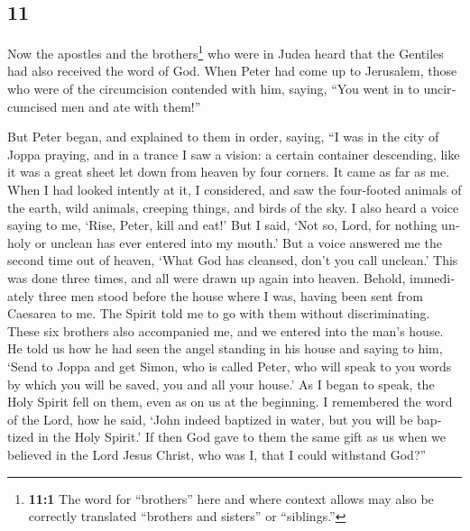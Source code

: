 \begin{paracol}{2}
\switchcolumn
\begin{otherlanguage}{english}

\hypertarget{section-21}{%
\section{11}\label{section-21}}

 Now the apostles and the brothers\footnote{\textbf{11:1}
  The word for ``brothers'' here and where context allows may also be
  correctly translated ``brothers and sisters'' or ``siblings.''} who
were in Judea heard that the Gentiles had also received the word of God.
 When Peter had come up to Jerusalem, those who were of
the circumcision contended with him,  saying, ``You went
in to uncircumcised men and ate with them!''

 But Peter began, and explained to them in order, saying,
 ``I was in the city of Joppa praying, and in a trance I
saw a vision: a certain container descending, like it was a great sheet
let down from heaven by four corners. It came as far as me.
 When I had looked intently at it, I considered, and saw
the four-footed animals of the earth, wild animals, creeping things, and
birds of the sky.  I also heard a voice saying to me,
`Rise, Peter, kill and eat!'  But I said, `Not so, Lord,
for nothing unholy or unclean has ever entered into my mouth.'
 But a voice answered me the second time out of heaven,
`What God has cleansed, don't you call unclean.'  This
was done three times, and all were drawn up again into heaven.
 Behold, immediately three men stood before the house
where I was, having been sent from Caesarea to me.  The
Spirit told me to go with them without discriminating. These six
brothers also accompanied me, and we entered into the man's house.
 He told us how he had seen the angel standing in his
house and saying to him, `Send to Joppa and get Simon, who is called
Peter,  who will speak to you words by which you will be
saved, you and all your house.'  As I began to speak, the
Holy Spirit fell on them, even as on us at the beginning.
 I remembered the word of the Lord, how he said, `John
indeed baptized in water, but you will be baptized in the Holy Spirit.'
 If then God gave to them the same gift as us when we
believed in the Lord Jesus Christ, who was I, that I could withstand
God?''


\end{otherlanguage}
\end{paracol}
